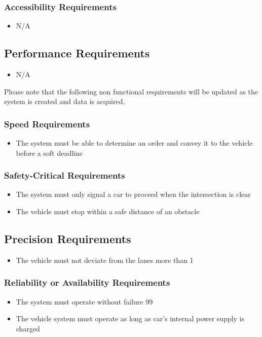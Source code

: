 \documentclass [12pt]{article}
\begin{document}
\subsubsection{Accessibility Requirements }
	\begin{itemize}
		\item N/A
	\end{itemize}
 
\subsection{Performance Requirements}
	\begin{itemize}
		\item N/A
	\end{itemize}
	Please note that the following  non functional requirements will be updated as the system is created and data is acquired.

\subsubsection{Speed Requirements }
	\begin{itemize}
		\item The system must be able to determine an order and convey it to the vehicle before a soft deadline
	\end{itemize}

\subsubsection{Safety-Critical Requirements }
	\begin{itemize}
		\item The system must only signal a car to proceed when the intersection is clear
		\item The vehicle must stop within a safe distance of an obstacle
	\end{itemize}	

\subsection{Precision Requirements}
	\begin{itemize}
		\item The vehicle must not deviate from the lanes more than 1%
	\end{itemize}

\subsubsection{Reliability or Availability  Requirements}
	\begin{itemize}
		\item The system must operate without failure 99%
		\item The vehicle system must operate as long as car’s internal power supply is charged
	\end{itemize}
\end{document}
